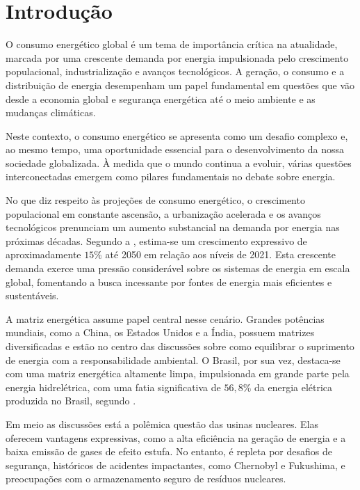 \chapter{Introdução} \label{chap:introduction}

O consumo energético global é um tema de importância crítica na atualidade, marcada por uma crescente demanda por energia impulsionada pelo crescimento populacional, industrialização e avanços tecnológicos. A geração, o consumo e a distribuição de energia desempenham um papel fundamental em questões que vão desde a economia global e segurança energética até o meio ambiente e as mudanças climáticas.

Neste contexto, o consumo energético se apresenta como um desafio complexo e, ao mesmo tempo, uma oportunidade essencial para o desenvolvimento da nossa sociedade globalizada. À medida que o mundo continua a evoluir, várias questões interconectadas emergem como pilares fundamentais no debate sobre energia.

No que diz respeito às projeções de consumo energético, o crescimento populacional em constante ascensão, a urbanização acelerada e os avanços tecnológicos prenunciam um aumento substancial na demanda por energia nas próximas décadas. Segundo a \citet{ExxonMobil2023}, estima-se um crescimento expressivo de aproximadamente \(15\%\) até 2050 em relação aos níveis de 2021. Esta crescente demanda exerce uma pressão considerável sobre os sistemas de energia em escala global, fomentando a busca incessante por fontes de energia mais eficientes e sustentáveis.

A matriz energética assume papel central nesse cenário. Grandes potências mundiais, como a China, os Estados Unidos e a Índia, possuem matrizes diversificadas e estão no centro das discussões sobre como equilibrar o suprimento de energia com a responsabilidade ambiental. O Brasil, por sua vez, destaca-se com uma matriz energética altamente limpa, impulsionada em grande parte pela energia hidrelétrica, com uma fatia significativa de \(56,8\%\) da energia elétrica produzida no Brasil, segundo \citet{epe2022}.

Em meio as discussões está a polêmica questão das usinas nucleares. Elas oferecem vantagens expressivas, como a alta eficiência na geração de energia e a baixa emissão de gases de efeito estufa. No entanto, é repleta por desafios de segurança, históricos de acidentes impactantes, como Chernobyl e Fukushima, e preocupações com o armazenamento seguro de resíduos nucleares.

